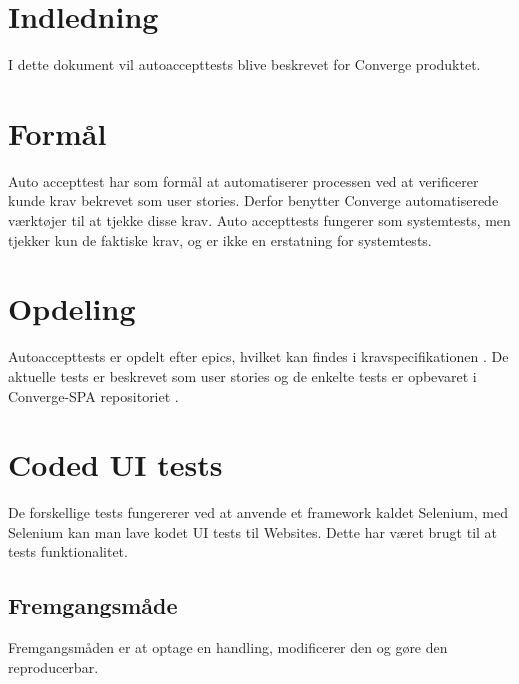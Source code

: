 \section{Indledning}

I dette dokument vil autoaccepttests blive beskrevet for Converge produktet.

\section{Formål}

Auto accepttest har som formål at automatiserer processen ved at verificerer kunde krav bekrevet som user stories. Derfor benytter Converge automatiserede værktøjer til at tjekke disse krav. Auto accepttests fungerer som systemtests, men tjekker kun de faktiske krav, og er ikke en erstatning for systemtests.

\section{Opdeling}

Autoaccepttests er opdelt efter epics, hvilket kan findes i kravspecifikationen \cite{documentation-kravspec}. De aktuelle tests er beskrevet som user stories og de enkelte tests er opbevaret i Converge-SPA repositoriet \cite{repository-converge-spa}.

\section{Coded UI tests}

De forskellige tests fungererer ved at anvende et framework kaldet Selenium, med Selenium kan man lave kodet UI tests til Websites. Dette har været brugt til at tests funktionalitet.

\subsection{Fremgangsmåde}

Fremgangsmåden er at optage en handling, modificerer den og gøre den reproducerbar. 